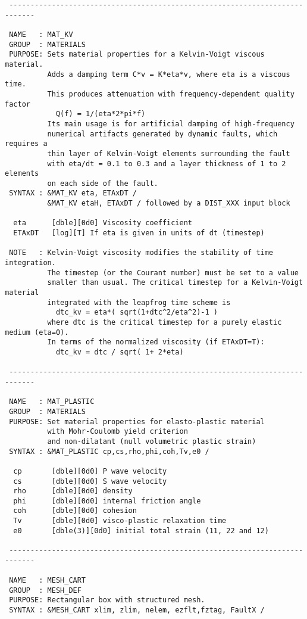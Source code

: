 \begin{verbatim}
 ----------------------------------------------------------------------------

 NAME   : MAT_KV
 GROUP  : MATERIALS
 PURPOSE: Sets material properties for a Kelvin-Voigt viscous material.
          Adds a damping term C*v = K*eta*v, where eta is a viscous time.
          This produces attenuation with frequency-dependent quality factor
            Q(f) = 1/(eta*2*pi*f)
          Its main usage is for artificial damping of high-frequency 
          numerical artifacts generated by dynamic faults, which requires a
          thin layer of Kelvin-Voigt elements surrounding the fault
          with eta/dt = 0.1 to 0.3 and a layer thickness of 1 to 2 elements
          on each side of the fault.
 SYNTAX : &MAT_KV eta, ETAxDT /
          &MAT_KV etaH, ETAxDT / followed by a DIST_XXX input block

  eta      [dble][0d0] Viscosity coefficient
  ETAxDT   [log][T] If eta is given in units of dt (timestep)

 NOTE   : Kelvin-Voigt viscosity modifies the stability of time integration.
          The timestep (or the Courant number) must be set to a value
          smaller than usual. The critical timestep for a Kelvin-Voigt material 
          integrated with the leapfrog time scheme is
            dtc_kv = eta*( sqrt(1+dtc^2/eta^2)-1 )
          where dtc is the critical timestep for a purely elastic medium (eta=0).
          In terms of the normalized viscosity (if ETAxDT=T):
            dtc_kv = dtc / sqrt( 1+ 2*eta)

 ----------------------------------------------------------------------------

 NAME   : MAT_PLASTIC
 GROUP  : MATERIALS
 PURPOSE: Set material properties for elasto-plastic material
          with Mohr-Coulomb yield criterion
          and non-dilatant (null volumetric plastic strain)
 SYNTAX : &MAT_PLASTIC cp,cs,rho,phi,coh,Tv,e0 /

  cp       [dble][0d0] P wave velocity
  cs       [dble][0d0] S wave velocity
  rho      [dble][0d0] density
  phi      [dble][0d0] internal friction angle
  coh      [dble][0d0] cohesion
  Tv       [dble][0d0] visco-plastic relaxation time
  e0       [dble(3)][0d0] initial total strain (11, 22 and 12)

 ----------------------------------------------------------------------------

 NAME   : MESH_CART
 GROUP  : MESH_DEF
 PURPOSE: Rectangular box with structured mesh.
 SYNTAX : &MESH_CART xlim, zlim, nelem, ezflt,fztag, FaultX /


\end{verbatim}
